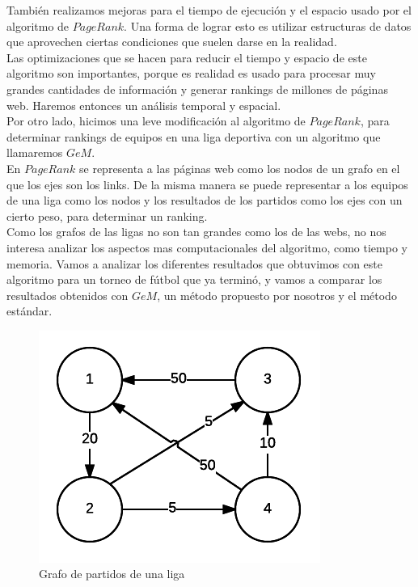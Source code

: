 También realizamos mejoras para el tiempo de ejecución y el espacio usado por el algoritmo de $PageRank$. Una forma de lograr esto es utilizar estructuras de datos que aprovechen ciertas condiciones que suelen darse en la realidad.\\

 Las optimizaciones que se hacen para reducir el tiempo y espacio de este algoritmo son importantes, porque es realidad es usado para procesar muy grandes cantidades de información y generar rankings de millones de páginas web. Haremos entonces un análisis temporal y espacial.\\

Por otro lado, hicimos una leve modificación al algoritmo de $PageRank$, para determinar rankings de equipos en una liga deportiva con un algoritmo que llamaremos $GeM$. \\

En $PageRank$ se representa a las páginas web como los nodos de un grafo en el que los ejes son los links. De la misma manera se puede representar a los equipos de una liga como los nodos y los resultados de los partidos como los ejes con un cierto peso, para determinar un ranking.\\

Como los grafos de las ligas no son tan grandes como los de las webs, no nos interesa analizar los aspectos mas computacionales del algoritmo, como tiempo y memoria. Vamos a analizar los diferentes resultados que obtuvimos con este algoritmo para un torneo de fútbol que ya terminó, y vamos a comparar los resultados obtenidos con $GeM$, un método propuesto por nosotros y el método estándar.\\


\begin{figure}
  \vspace{-20pt}
  \begin{center}
    \includegraphics[scale= 0.8]{imagenes/grafo4equipos.png}
  \end{center}
  \vspace{-20pt}
  \caption{Grafo de partidos de una liga}
  \vspace{-10pt}
  \label{fig:img2}
\end{figure}


